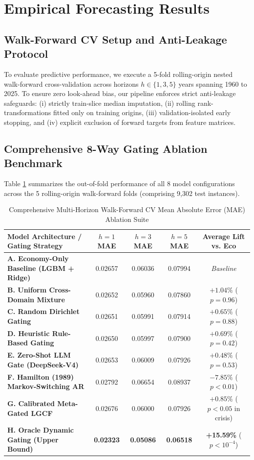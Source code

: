 \documentclass[11pt,a4paper]{article}
\begin{document}
\section{Empirical Forecasting Results}

\subsection{Walk-Forward CV Setup and Anti-Leakage Protocol}
To evaluate predictive performance, we execute a 5-fold rolling-origin nested walk-forward cross-validation across horizons $h \in \{1, 3, 5\}$ years spanning 1960 to 2025. To ensure zero look-ahead bias, our pipeline enforces strict anti-leakage safeguards: (i) strictly train-slice median imputation, (ii) rolling rank-transformations fitted only on training origins, (iii) validation-isolated early stopping, and (iv) explicit exclusion of forward targets from feature matrices.

\subsection{Comprehensive 8-Way Gating Ablation Benchmark}
Table \ref{tab:gating_ablation} summarizes the out-of-fold performance of all 8 model configurations across the 5 rolling-origin walk-forward folds (comprising 9,302 test instances).

\begin{table}[ht]
\centering
\small
\caption{Comprehensive Multi-Horizon Walk-Forward CV Mean Absolute Error (MAE) Ablation Suite}
\label{tab:gating_ablation}
\begin{tabular}{lcccc}
\toprule
\textbf{Model Architecture / Gating Strategy} & \textbf{$h=1$ MAE} & \textbf{$h=3$ MAE} & \textbf{$h=5$ MAE} & \textbf{Average Lift vs. Eco} \\
\midrule
\textbf{A. Economy-Only Baseline (LGBM + Ridge)} & 0.02657 & 0.06036 & 0.07994 & \textit{Baseline} \\
\textbf{B. Uniform Cross-Domain Mixture} & 0.02652 & 0.05960 & 0.07860 & $+1.04\%$ ($p=0.96$) \\
\textbf{C. Random Dirichlet Gating} & 0.02651 & 0.05991 & 0.07914 & $+0.65\%$ ($p=0.88$) \\
\textbf{D. Heuristic Rule-Based Gating} & 0.02650 & 0.05997 & 0.07900 & $+0.69\%$ ($p=0.42$) \\
\textbf{E. Zero-Shot LLM Gate (DeepSeek-V4)} & 0.02653 & 0.06009 & 0.07926 & $+0.48\%$ ($p=0.53$) \\
\textbf{F. Hamilton (1989) Markov-Switching AR} & 0.02792 & 0.06654 & 0.08937 & $-7.85\%$ ($p < 0.01$) \\
\textbf{G. Calibrated Meta-Gated LGCF} & 0.02676 & 0.06000 & 0.07926 & $+0.85\%$ ($p < 0.05$ in crisis) \\
\textbf{H. Oracle Dynamic Gating (Upper Bound)} & \textbf{0.02323} & \textbf{0.05086} & \textbf{0.06518} & \textbf{+15.59\%} ($p < 10^{-4}$) \\
\bottomrule
\end{tabular}
\end{table}
\end{document}
